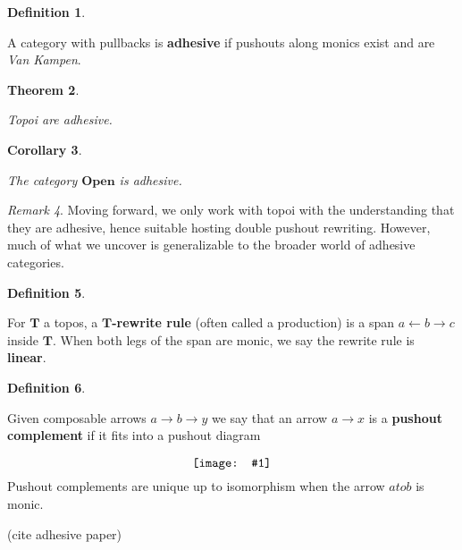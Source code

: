 \documentclass{amsart}
\newcommand{\defn}[1]{\textbf{#1}}
\newcommand{\cat}[1]{\mathbf{#1}}
\newcommand{\diagram}[1]{\raisebox{-0.5\height}{\texttt{[image: \#1]}}}
\newcommand{\OpenOb}{\mathbf{Open} }
\newcommand{\edit}[1]{\textcolor{editcolour}{(#1)}}
\newtheorem{theorem}{Theorem}[section]
\newtheorem{corollary}[theorem]{Corollary}
\theoremstyle{remark}
\newtheorem{remark}[theorem]{Remark}
\theoremstyle{definition}
\newtheorem{definition}[theorem]{Definition}
\begin{document}
\begin{definition}
\label{df:dpo_adhesive-category} 
	
  A category with pullbacks is \defn{adhesive} if pushouts along
  monics exist and are \emph{Van Kampen}.

\end{definition} 

\begin{theorem}
\label{thm:dpo_topoi-adhesive} 
	
  Topoi are adhesive.
	
\end{theorem}


\begin{corollary}
\label{thm:dpo_category-StrCsp-adhsv}
 	
  The category $ \OpenOb $ is adhesive.
 	
\end{corollary}

\begin{remark}

  Moving forward, we only work with topoi with the understanding that
  they are adhesive, hence suitable hosting double pushout rewriting.
  However, much of what we uncover is generalizable to the broader
  world of adhesive categories.
  
\end{remark}


\begin{definition}
\label{df:dpo_rewrite-rule} 
	
  For $ \cat{T} $ a topos, a \defn{$ \cat{T} $-rewrite rule}
  (often called a production) is a span $ a \gets b \to c $ inside
  $ \cat{T} $.  When both legs of the span are monic, we say the rewrite
  rule is \defn{linear}.
  
\end{definition}	

\begin{definition}
  \label{df_dpo_pushout-complement} 
	
  Given composable arrows $ a \to b \to y $ we say that an arrow
  $ a \to x $ is a \defn{pushout complement} if it fits into a pushout
  diagram
  \[
    \diagram{diag_rw_pushout-comp}
  \]
  Pushout complements are unique up to isomorphism when the arrow \( a
  to b \) is monic.

  \edit{cite adhesive paper}
  
\end{definition}
\end{document}
